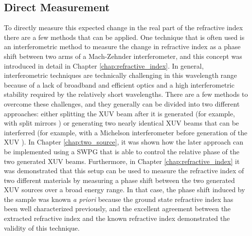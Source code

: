 \subsection{Direct Measurement}

To directly measure this expected change in the real part of the refractive index there are a few methods that can be applied.  One technique that is often used is an interferometric method to measure the change in refractive index as a phase shift between two arms of a Mach-Zehnder interferometer, and this concept was introduced in detail in Chapter \ref{chap:refractive_index}. In general, interferometric techniques are technically challenging in this wavelength range because of a lack of broadband and efficient optics and a high interferometric stability required by the relatively short wavelengths.  There are a few methods to overcome these challenges, and they generally can be divided into two different approaches: either splitting the XUV beam after it is generated (for example, with split mirrors \cite{nabekawaInterferometricAutocorrelationAttosecond2008, nabekawaInterferometryAttosecondPulse2013}) or generating two nearly identical XUV beams that can be interferred (for example, with a Michelson interferometer before generation of the XUV \cite{kovacevExtremeUltravioletFourierTransform2005}).  In Chapter \ref{chap:two_source}, it was shown how the later approach can be implemented using a SWPG that is able to control the relative phase of the two generated XUV beams.  Furthermore, in Chapter \ref{chap:refractive_index} it was demonstrated that this setup can be used to measure the refractive index of two different materials by measuring a phase shift between the two generated XUV sources over a broad energy range.  In that case, the phase shift induced by the sample was known \textit{a priori} because the ground state refractive index has been well characterized previously, and the excellent agreement between the extracted refractive index and the known refractive index demonstrated the validity of this technique.  


